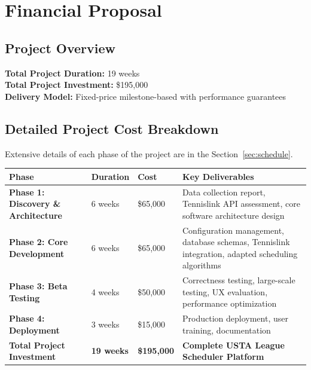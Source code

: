 \section{Financial Proposal}

\subsection{Project Overview}
\textbf{Total Project Duration:} 19 weeks\\
\textbf{Total Project Investment:} \$195,000\\
\textbf{Delivery Model:} Fixed-price milestone-based with performance guarantees

\subsection{Detailed Project Cost Breakdown}

Extensive details of each phase of the project are in the Section~\ref{sec:schedule}. 

\begin{longtable}{|p{4.5cm}|p{1.8cm}|p{1.5cm}|p{6cm}|}
\hline
\textbf{Phase} & \textbf{Duration} & \textbf{Cost} & \textbf{Key Deliverables} \\
\hline
\textbf{Phase 1: Discovery \& Architecture} & 6 weeks & \$65,000 & Data collection report, Tennislink API assessment, core software architecture design \\
\hline
\textbf{Phase 2: Core Development} & 6 weeks & \$65,000 & Configuration management, database schemas, Tennislink integration, adapted scheduling algorithms \\
\hline
\textbf{Phase 3: Beta Testing} & 4 weeks & \$50,000 & Correctness testing, large-scale testing, UX evaluation, performance optimization \\
\hline
\textbf{Phase 4: Deployment} & 3 weeks & \$15,000 & Production deployment, user training, documentation \\
\hline
\textbf{Total Project Investment} & \textbf{19 weeks} & \textbf{\$195,000} & \textbf{Complete USTA League Scheduler Platform} \\
\hline
\end{longtable}



